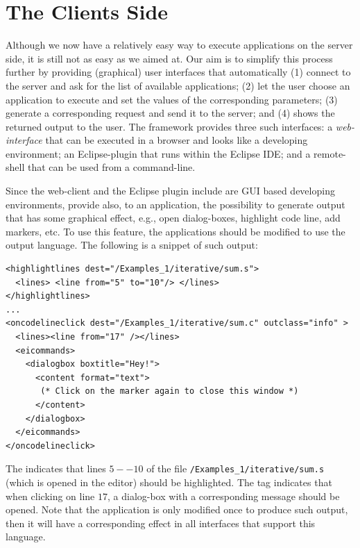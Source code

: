 \section{The Clients Side}
\label{ch:overview:arch:clients}

Although we now have a relatively easy way to execute applications on
the server side, it is still not as easy as we aimed at.
%
Our aim is to simplify this process further by providing (graphical)
user interfaces that automatically (1) connect to the \ei server and
ask for the list of available applications; (2) let the user choose an
application to execute and set the values of the corresponding
parameters; (3) generate a corresponding request and send it to the
\ei server; and (4) shows the returned output to the user.
%
The \ei framework provides three such interfaces: a
\emph{web-interface} that can be executed in a browser and looks like
a developing environment; an Eclipse-plugin that runs within the
Eclipse IDE; and a remote-shell that can be used from a command-line.

Since the web-client and the Eclipse plugin include are GUI based
developing environments, \ei provide also, to an application, the
possibility to generate output that has some graphical effect, e.g.,
open dialog-boxes, highlight code line, add markers, etc. To use this
feature, the applications should be modified to use the \ei output
language. The following is a snippet of such output:

\medskip
\begin{lstlisting}
<highlightlines dest="/Examples_1/iterative/sum.s"> 
  <lines> <line from="5" to="10"/> </lines>
</highlightlines>
...
<oncodelineclick dest="/Examples_1/iterative/sum.c" outclass="info" >
  <lines><line from="17" /></lines>
  <eicommands>
    <dialogbox boxtitle="Hey!"> 
      <content format="text">
       (* Click on the marker again to close this window *)
      </content>
    </dialogbox>
  </eicommands>
</oncodelineclick>

\end{lstlisting}

\medskip
\noindent
The  indicates that lines $5--10$ of the file
\texttt{/Examples\_1/iterative/sum.s} (which is opened in the editor)
should be highlighted. The  tag indicates that
when clicking on line $17$, a dialog-box with a corresponding message
should be opened.
%
Note that the application is only modified once to produce such
output, then it will have a corresponding effect in all interfaces
that support this language.





